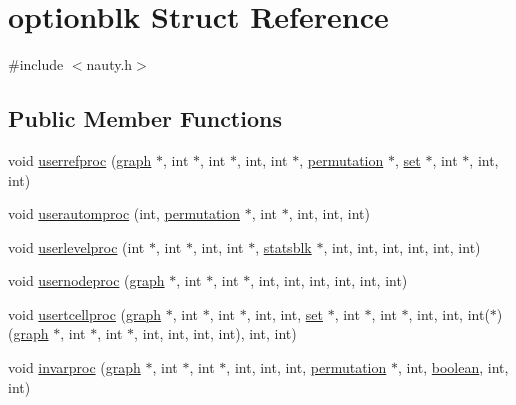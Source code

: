 \hypertarget{structoptionblk}{}\section{optionblk Struct Reference}
\label{structoptionblk}


{\ttfamily \#include $<$nauty.\+h$>$}

\subsection*{Public Member Functions}
\begin{DoxyCompactItemize}
\item 
void \mbox{\hyperlink{structoptionblk_a714f76f0799af813ddd1d38f4cda280e}{userrefproc}} (\mbox{\hyperlink{nauty_8h_a28c08db7c5948ab173e0f0497773f2f1}{graph}} $\ast$, int $\ast$, int $\ast$, int, int $\ast$, \mbox{\hyperlink{classpermutation}{permutation}} $\ast$, \mbox{\hyperlink{nauty_8h_a9690bea211101f22a5e154087590c3da}{set}} $\ast$, int $\ast$, int, int)
\item 
void \mbox{\hyperlink{structoptionblk_af9beba39e0ef5390236fa4ba21bb22cc}{userautomproc}} (int, \mbox{\hyperlink{classpermutation}{permutation}} $\ast$, int $\ast$, int, int, int)
\item 
void \mbox{\hyperlink{structoptionblk_a6f25aadf1572fa2cd8b6b2bec2cdf21a}{userlevelproc}} (int $\ast$, int $\ast$, int, int $\ast$, \mbox{\hyperlink{structstatsblk}{statsblk}} $\ast$, int, int, int, int, int, int)
\item 
void \mbox{\hyperlink{structoptionblk_abd54a17ee8ac6152b1df9e62dbc38dd6}{usernodeproc}} (\mbox{\hyperlink{nauty_8h_a28c08db7c5948ab173e0f0497773f2f1}{graph}} $\ast$, int $\ast$, int $\ast$, int, int, int, int, int, int)
\item 
void \mbox{\hyperlink{structoptionblk_a3fc9271f35d31f4b1caa850101227aec}{usertcellproc}} (\mbox{\hyperlink{nauty_8h_a28c08db7c5948ab173e0f0497773f2f1}{graph}} $\ast$, int $\ast$, int $\ast$, int, int, \mbox{\hyperlink{nauty_8h_a9690bea211101f22a5e154087590c3da}{set}} $\ast$, int $\ast$, int $\ast$, int, int, int($\ast$)(\mbox{\hyperlink{nauty_8h_a28c08db7c5948ab173e0f0497773f2f1}{graph}} $\ast$, int $\ast$, int $\ast$, int, int, int, int), int, int)
\item 
void \mbox{\hyperlink{structoptionblk_a40fdcb235a8c4c4d3d595fbba271cc3e}{invarproc}} (\mbox{\hyperlink{nauty_8h_a28c08db7c5948ab173e0f0497773f2f1}{graph}} $\ast$, int $\ast$, int $\ast$, int, int, int, \mbox{\hyperlink{classpermutation}{permutation}} $\ast$, int, \mbox{\hyperlink{nauty_8h_a621c38f1f10a1c565d897e3178b16d6e}{boolean}}, int, int)
\end{DoxyCompactItemize}
